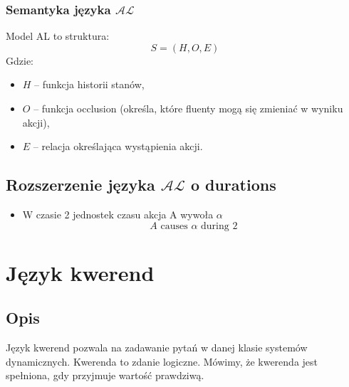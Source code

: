 \documentclass{article}
\begin{document}
\subsubsection{Semantyka języka $\mathcal{AL}$}
Model AL to struktura:
\begin{equation}
    S = (H, O, E)
\end{equation}
Gdzie:
\begin{itemize}
    \item $H$ – funkcja historii stanów,
    \item $O$ – funkcja occlusion (określa, które fluenty mogą się zmieniać w wyniku akcji),
    \item $E$ – relacja określająca wystąpienia akcji.
\end{itemize}

\subsection{Rozszerzenie języka $\mathcal{AL}$ o durations}
\begin{itemize}
    \item W czasie 2 jednostek czasu akcja A wywoła $\alpha$
    \begin{equation}
        A \text{ causes } \alpha \text{ during 2} 
    \end{equation}
\end{itemize}

\section{Język kwerend}

\subsection{Opis}
Język kwerend pozwala na zadawanie pytań w danej klasie systemów dynamicznych. Kwerenda to zdanie logiczne. Mówimy, że kwerenda jest spełniona, gdy przyjmuje wartość prawdziwą.
\end{document}
